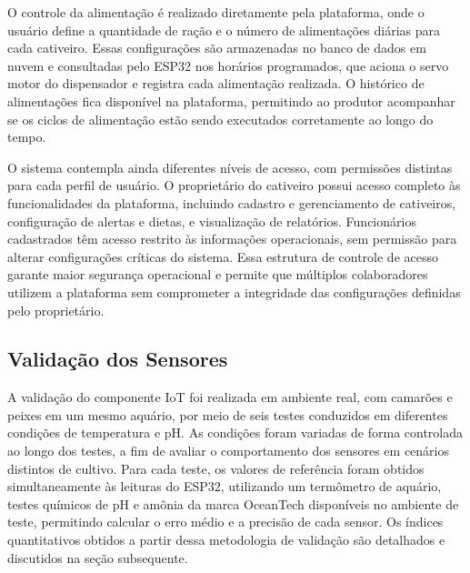 \documentclass[11pt,a4paper]{article}
\begin{document}
O controle da alimentação é realizado diretamente pela plataforma, onde o usuário define a quantidade de ração e o número de alimentações diárias para cada cativeiro. Essas configurações são armazenadas no banco de dados em nuvem e consultadas pelo ESP32 nos horários programados, que aciona o servo motor do dispensador e registra cada alimentação realizada. O histórico de alimentações fica disponível na plataforma, permitindo ao produtor acompanhar se os ciclos de alimentação estão sendo executados corretamente ao longo do tempo.

O sistema contempla ainda diferentes níveis de acesso, com permissões distintas para cada perfil de usuário. O proprietário do cativeiro possui acesso completo às funcionalidades da plataforma, incluindo cadastro e gerenciamento de cativeiros, configuração de alertas e dietas, e visualização de relatórios. Funcionários cadastrados têm acesso restrito às informações operacionais, sem permissão para alterar configurações críticas do sistema. Essa estrutura de controle de acesso garante maior segurança operacional e permite que múltiplos colaboradores utilizem a plataforma sem comprometer a integridade das configurações definidas pelo proprietário.

\subsection{Validação dos Sensores}

A validação do componente IoT foi realizada em ambiente real, com camarões e peixes em um mesmo aquário, por meio de seis testes conduzidos em diferentes condições de temperatura e pH. As condições foram variadas de forma controlada ao longo dos testes, a fim de avaliar o comportamento dos sensores em cenários distintos de cultivo. Para cada teste, os valores de referência foram obtidos simultaneamente às leituras do ESP32, utilizando um termômetro de aquário, testes químicos de pH e amônia da marca OceanTech disponíveis no ambiente de teste, permitindo calcular o erro médio e a precisão de cada sensor. Os índices quantitativos obtidos a partir dessa metodologia de validação são detalhados e discutidos na seção subsequente.
\end{document}
